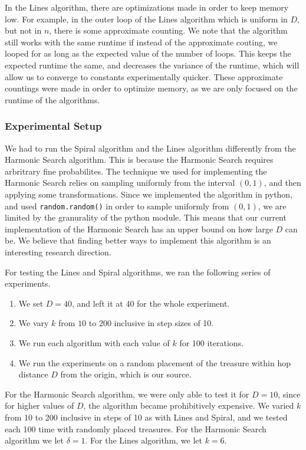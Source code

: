 \documentclass[runningheads,a4paper]{llncs}
\begin{document}
In the Lines algorithm, there are optimizations made in order to keep memory low. For example, in the outer loop of the Lines algorithm which is uniform in $D$, but not in $n$, there is some approximate counting. We note that the algorithm still works with the same runtime if instead of the approximate couting, we looped for as long as the expected value of the number of loops. This keeps the expected runtime the same, and decreases the variance of the runtime, which will allow us to converge to constants experimentally quicker. These approximate countings were made in order to optimize memory, as we are only focused on the runtime of the algorithms.

\subsubsection{Experimental Setup}

We had to run the Spiral algorithm and the Lines algorithm differently from the Harmonic Search algorithm. This is because the Harmonic Search requires arbritrary fine probabilites. The technique we used for implementing the Harmonic Search relies on sampling uniformly from the interval $(0, 1)$, and then applying some transformations. Since we implemented the algorithm in python, and used \texttt{random.random()} in order to sample uniformly from $(0,1)$, we are limited by the granurality of the python module. This means that our current implementation of the Harmonic Search has an upper bound on how large $D$ can be. We believe that finding better ways to implement this algorithm is an interesting research direction.

For testing the Lines and Spiral algorithms, we ran the following series of experiments. 
\begin{enumerate}
\item We set $D = 40$, and left it at 40 for the whole experiment. 
\item We vary $k$ from $10$ to $200$ inclusive in step sizes of 10. 
\item We run each algorithm with each value of $k$ for 100 iterations.
\item We run the experiments on a random placement of the treasure within hop distance $D$ from the origin, which is our source.
\end{enumerate}

For the Harmonic Search algorithm, we were only able to test it for $D = 10$, since for higher values of $D$, the algorithm became prohibitively expensive. We varied $k$ from 10 to 200 inclusive in steps of 10 as with Lines and Spiral, and we tested each 100 time with randomly placed treasures. For the Harmonic Search algorithm we let $\delta = 1$. For the Lines algorithm, we let $k = 6$.  
\end{document}
